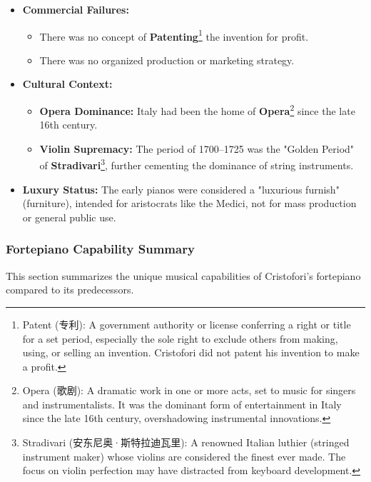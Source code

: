\documentclass[math,code]{amznotes}
\theoremstyle{remark}
\begin{document}
\begin{itemize}
    \item \textbf{Commercial Failures:}
    \begin{itemize}
        \item There was no concept of \textbf{Patenting}\footnote{Patent (专利): A government authority or license conferring a right or title for a set period, especially the sole right to exclude others from making, using, or selling an invention. Cristofori did not patent his invention to make a profit.} the invention for profit.
        \item There was no organized production or marketing strategy.
    \end{itemize}
    \item \textbf{Cultural Context:}
    \begin{itemize}
        \item \textbf{Opera Dominance:} Italy had been the home of \textbf{Opera}\footnote{Opera (歌剧): A dramatic work in one or more acts, set to music for singers and instrumentalists. It was the dominant form of entertainment in Italy since the late 16th century, overshadowing instrumental innovations.} since the late 16th century.
        \item \textbf{Violin Supremacy:} The period of 1700–1725 was the "Golden Period" of \textbf{Stradivari}\footnote{Stradivari (安东尼奥·斯特拉迪瓦里): A renowned Italian luthier (stringed instrument maker) whose violins are considered the finest ever made. The focus on violin perfection may have distracted from keyboard development.}, further cementing the dominance of string instruments.
    \end{itemize}
    \item \textbf{Luxury Status:} The early pianos were considered a "luxurious furnish" (furniture), intended for aristocrats like the Medici, not for mass production or general public use.
\end{itemize}

\subsubsection{Fortepiano Capability Summary}

This section summarizes the unique musical capabilities of Cristofori's fortepiano compared to its predecessors.
\end{document}
